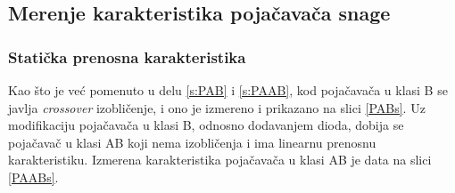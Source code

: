 \documentclass[a4paper, 12pt, diplomski]{etf}
\begin{document}
\subsection{Merenje karakteristika pojačavača snage}
\subsubsection{Statička prenosna karakteristika}

Kao što je već pomenuto u delu \ref{s:PAB} i \ref{s:PAAB}, kod pojačavača u klasi B se javlja \textit{crossover} izobličenje, i ono je izmereno i prikazano na slici \ref{PABs}. Uz modifikaciju pojačavača u klasi B, odnosno dodavanjem dioda, dobija se pojačavač u klasi AB koji nema izobličenja i ima linearnu prenosnu karakteristiku. Izmerena karakteristika pojačavača u klasi AB je data na slici \ref{PAABs}.
\end{document}
